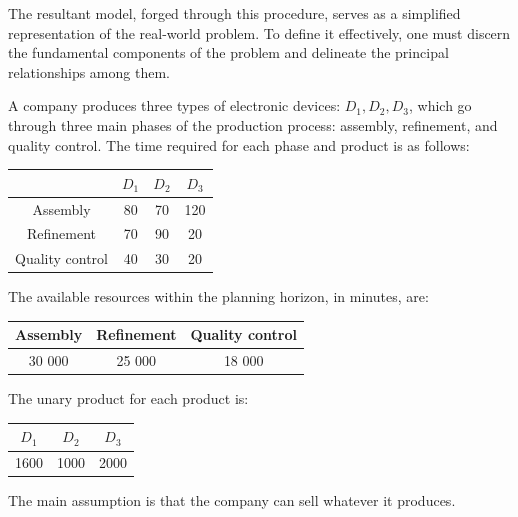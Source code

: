 The resultant model, forged through this procedure, serves as a simplified representation of the real-world problem. 
To define it effectively, one must discern the fundamental components of the problem and delineate the principal relationships among them.
\begin{example}
    A company produces three types of electronic devices: $D_1,D_2,D_3$, which go through three main phases of the production process: assembly, refinement, and quality control.
    The time required for each phase and product is as follows:
    \begin{table}[H]
        \centering
        \begin{tabular}{c|ccc|}
        \cline{2-4}
        \textbf{}                             & \textbf{$D_1$} & \textbf{$D_2$} & $D_3$ \\ \hline
        \multicolumn{1}{|c|}{Assembly}        & 80             & 70             & 120   \\
        \multicolumn{1}{|c|}{Refinement}      & 70             & 90             & 20    \\
        \multicolumn{1}{|c|}{Quality control} & 40             & 30             & 20    \\ \hline
        \end{tabular}
    \end{table}
    The available resources within the planning horizon, in minutes, are:
    \begin{table}[H]
        \centering
        \begin{tabular}{|c|c|c|}
        \hline
        \textbf{Assembly} & \textbf{Refinement} & \textbf{Quality control} \\ \hline
        30 000            & 25 000              & 18 000                   \\ \hline
        \end{tabular}
    \end{table}
    The unary product for each product is: 
    \begin{table}[H]
        \centering
        \begin{tabular}{|c|c|c|}
        \hline
        $D_1$          & $D_2$          & $D_3$ \\ \hline
        1600           & 1000           & 2000  \\ \hline
        \end{tabular}
    \end{table}
    The main assumption is that the company can sell whatever it produces.


\end{example}
